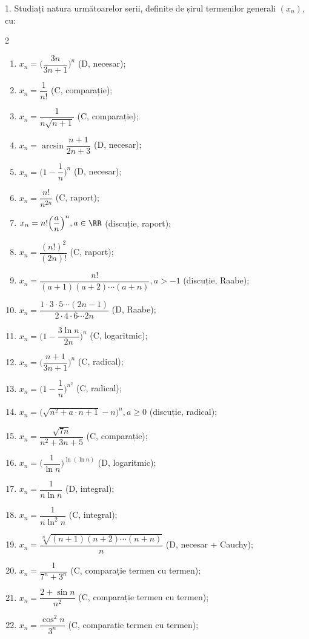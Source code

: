 1. Studiați natura următoarelor serii, definite de șirul termenilor generali $ (x_n) $, cu:
\begin{multicols}{2}
  \begin{enumerate}[(1)]
  \item $ x_n = \Big( \dfrac{3n}{3n + 1} \Big)^n $ (D, necesar);
  \item $ x_n = \dfrac{1}{n!} $ (C, comparație);
  \item $ x_n = \dfrac{1}{n \sqrt{n+1}} $ (C, comparație);
  \item $ x_n = \arcsin \dfrac{n+1}{2n + 3} $ (D, necesar);
  \item $ x_n = \Big( 1 - \dfrac{1}{n} \Big)^n $ (D, necesar);
  \item $ x_n = \dfrac{n!}{n^{2n}}$ (C, raport);
  \item $ x_n = n! \Big( \dfrac{a}{n} \Big)^n, a \in \RR $ (discuție, raport);
  \item $ x_n = \dfrac{(n!)^2}{(2n)!} $ (C, raport);
  \item $ x_n = \dfrac{n!}{(a + 1)(a+2) \cdots (a+n)}, a > -1 $ (dis\-cu\-ți\-e, Raabe);
  \item $ x_n = \dfrac{1 \cdot 3 \cdot 5 \cdots (2n - 1)}{2 \cdot 4 \cdot 6 \cdots 2n} $ (D, Raabe);
  \item $ x_n = \Big( 1 - \dfrac{3\ln n}{2n} \Big)^n $ (C, logaritmic);
  \item $ x_n = \Big( \dfrac{n + 1}{3n + 1} \Big)^n $ (C, radical);
  \item $ x_n = \Big( 1 - \dfrac{1}{n} \Big)^{n^2} $ (C, radical);
  \item $ x_n = \big( \sqrt{n^2 + a\cdot n + 1} - n \big)^n, a \geq 0 $ (discuție, radical);
  \item $ x_n = \dfrac{\sqrt{7n}}{n^2 + 3n + 5} $ (C, comparație);
  \item $ x_n = \Big( \dfrac{1}{\ln n} \Big)^{\ln(\ln n)} $ (D, logaritmic);
  \item $ x_n = \dfrac{1}{n \ln n} $ (D, integral);
  \item $ x_n = \dfrac{1}{n \ln^2 n} $ (C, integral);
  \item $ x_n = \dfrac{\sqrt[n]{(n+1)(n+2) \cdots (n + n)}}{n} $ (D, necesar + Cauchy);
  \item $ x_n = \dfrac{1}{7^n + 3^n} $ (C, comparație termen cu termen);
  \item $ x_n = \dfrac{2 + \sin n}{n^2} $ (C, comparație termen cu termen);
  \item $ x_n = \dfrac{\cos^2 n}{3^n} $ (C, comparație termen cu termen);

\end{enumerate}
\end{multicols}
